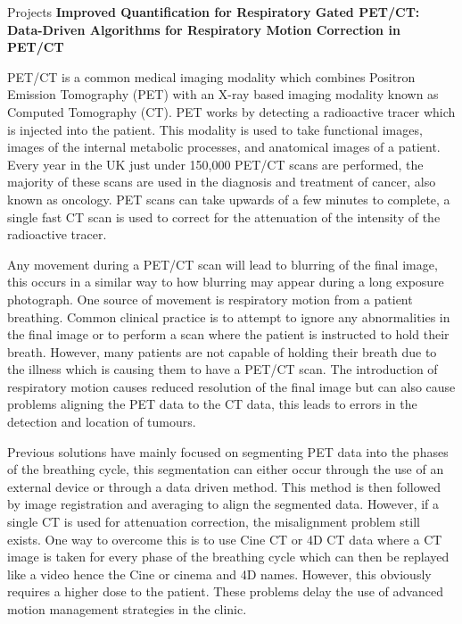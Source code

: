 \documentclass{cv}
\begin{document}
\begin{rSection}{Projects}
{\bf Improved Quantification for Respiratory Gated PET/CT: Data-Driven Algorithms for Respiratory Motion Correction in PET/CT} \hfill {\em} 
\item PET/CT is a common medical imaging modality which combines Positron Emission Tomography (PET) with an X-ray based imaging modality known as Computed Tomography (CT). PET works by detecting a radioactive tracer which is injected into the patient. This modality is used to take functional images, images of the internal metabolic processes, and anatomical images of a patient. Every year in the UK just under 150,000 PET/CT scans are performed, the majority of these scans are used in the diagnosis and treatment of cancer, also known as oncology. PET scans can take upwards of a few minutes to complete, a single fast CT scan is used to correct for the attenuation of the intensity of the radioactive tracer.

\item Any movement during a PET/CT scan will lead to blurring of the final image, this occurs in a similar way to how blurring may appear during a long exposure photograph. One source of movement is respiratory motion from a patient breathing. Common clinical practice is to attempt to ignore any abnormalities in the final image or to perform a scan where the patient is instructed to hold their breath. However, many patients are not capable of holding their breath due to the illness which is causing them to have a PET/CT scan. The introduction of respiratory motion causes reduced resolution of the final image but can also cause problems aligning the PET data to the CT data, this leads to errors in the detection and location of tumours.

\item Previous solutions have mainly focused on segmenting PET data into the phases of the breathing cycle, this segmentation can either occur through the use of an external device or through a data driven method. This method is then followed by image registration and averaging to align the segmented data. However, if a single CT is used for attenuation correction, the misalignment problem still exists. One way to overcome this is to use Cine CT or 4D CT data where a CT image is taken for every phase of the breathing cycle which can then be replayed like a video hence the Cine or cinema and 4D names. However, this obviously requires a higher dose to the patient. These problems delay the use of advanced motion management strategies in the clinic.


\end{rSection}
\end{document}
